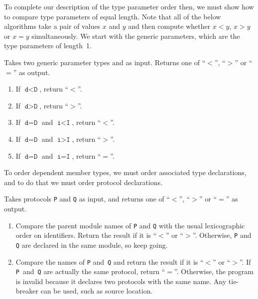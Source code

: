 \documentclass[../generics]{subfiles}
\begin{document}
To complete our description of the type parameter order then, we must show how to compare type parameters of equal length. Note that all of the below algorithms take a pair of values $x$ and $y$ and then compute whether $x<y$, $x>y$ or $x=y$ simultaneously. We start with the generic parameters, which are the type parameters of length~1.

\begin{algorithm}\label{generic parameter order} Takes two generic parameter types  and  as input. Returns one of ``$<$'', ``$>$'' or ``$=$'' as output.
\begin{enumerate}
\item If $\texttt{d}<\texttt{D}$, return ``$<$''.
\item If $\texttt{d}>\texttt{D}$, return ``$>$''.
\item If $\texttt{d}=\texttt{D}$ and $\texttt{i}<\texttt{I}$, return ``$<$''.
\item If $\texttt{d}=\texttt{D}$ and $\texttt{i}>\texttt{I}$, return ``$>$''.
\item If $\texttt{d}=\texttt{D}$ and $\texttt{i}=\texttt{I}$, return ``$=$''.
\end{enumerate}
\end{algorithm}

To order dependent member types, we must order associated type declarations, and to do that we must order protocol declarations.

\begin{algorithm}\label{linear protocol order} Takes protocols \texttt{P} and \texttt{Q} as input, and returns one of ``$<$'', ``$>$'' or ``$=$'' as output.
\begin{enumerate}
\item Compare the parent module names of \texttt{P} and \texttt{Q} with the usual lexicographic order on identifiers. Return the result if it is ``$<$'' or ``$>$''. Otherwise, \texttt{P} and \texttt{Q} are declared in the same module, so keep going.
\item Compare the names of \texttt{P} and~\texttt{Q} and return the result if it is ``$<$'' or ``$>$''. If \texttt{P}~and~\texttt{Q} are actually the same protocol, return ``$=$''. Otherwise, the program is invalid because it declares two protocols with the same name. Any tie-breaker can be used, such as source location.
\end{enumerate}
\end{algorithm}
\end{document}

